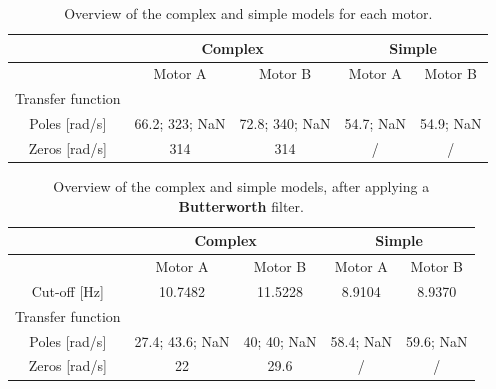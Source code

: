 \documentclass[a4paper,kul]{kulakarticle} %
\begin{document}
\begin{table}[htp]
	\centering
	\caption{Overview of the complex and simple models for each motor.}
	\label{tab:overview}
	\bgroup
	\def\arraystretch{1.8}
	\begin{tabular}{|c||cc||cc|}
		\hline & \multicolumn{2}{c||}{\textbf{Complex}} & \multicolumn{2}{c|}{\textbf{Simple}} 
		\\ \hline \hline
		& \multicolumn{1}{c|}{Motor A} & Motor B & \multicolumn{1}{c|}{Motor A} & Motor B
		\\ \hline
		Transfer function & \multicolumn{1}{c|}{\scalebox{1.15}{$\frac{0.6952\text{ }z + 0.7978}{z^3 - 0.04632\text{ }z^2 - 0.242\text{ }z}$}} & \scalebox{1.15}{$\frac{0.6901\text{ }z + 0.6834}{z^3 - 0.2128\text{ }z^2 - 0.1303\text{ }z}$} & \multicolumn{1}{c|}{\scalebox{1.15}{$\frac{ 0.8842}{z^2 - 0.5787\text{ }z}$}} & \scalebox{1.15}{$\frac{0.8832}{z^2 - 0.5778\text{ }z}$} 
		\\ \hline
		Poles [rad/s] & \multicolumn{1}{c|}{66.2; 323; NaN} & 72.8; 340; NaN & \multicolumn{1}{c|}{54.7; NaN} & 54.9; NaN
		\\ \hline
		Zeros [rad/s] & \multicolumn{1}{c|}{314} & 314 & \multicolumn{1}{c|}{/} & /
		\\ \hline
	\end{tabular}
	\egroup
\end{table}

\begin{table}[htp]
	\centering
	\caption[Overview of the complex and simple models, after applying a Butterworth filter]{Overview of the complex and simple models, after applying a \textbf{Butterworth} filter.}
	\label{tab:overview_BW}
	\bgroup
	\def\arraystretch{1.8}
	\begin{tabular}{|c||cc||cc|}
		\hline & \multicolumn{2}{c||}{\textbf{Complex}} & \multicolumn{2}{c|}{\textbf{Simple}} 
		\\ \hline \hline
		& \multicolumn{1}{c|}{Motor A} & Motor B & \multicolumn{1}{c|}{Motor A} & Motor B
		\\ \hline
		Cut-off [Hz] & \multicolumn{1}{c|}{10.7482} & 11.5228 & \multicolumn{1}{c|}{8.9104} & 8.9370
		\\ \hline
		Transfer function & \multicolumn{1}{c|}{\scalebox{1.15}{$\frac{0.8998\text{ }z - 0.7222}{z^3 - 1.407\text{ }z^2 + 0.4917\text{ }z}$}} & \scalebox{1.15}{$\frac{0.8989\text{ }z - 0.6683}{z^3 - 1.354\text{ }z^2 + 0.4644\text{ }z}$} & \multicolumn{1}{c|}{\scalebox{1.15}{$\frac{0.9284}{z^2 - 0.5576\text{ }z}$}} & \scalebox{1.15}{$\frac{0.9393}{z^2 - 0.5509\text{ }z}$} 
		\\ \hline
		Poles [rad/s] & \multicolumn{1}{c|}{27.4; 43.6; NaN} & 40; 40; NaN & \multicolumn{1}{c|}{58.4; NaN} & 59.6; NaN
		\\ \hline
		Zeros [rad/s] & \multicolumn{1}{c|}{22} & 29.6 & \multicolumn{1}{c|}{/} & /
		\\ \hline
	\end{tabular}
	\egroup
\end{table}
\end{document}
